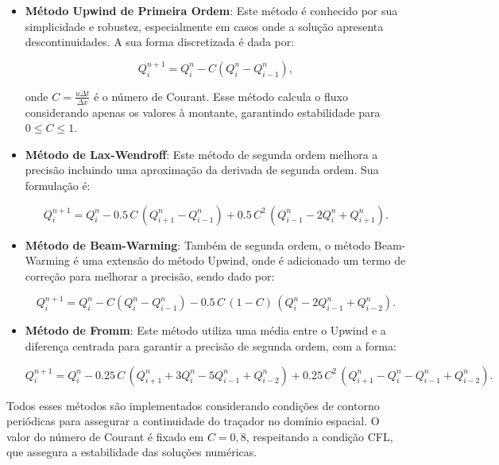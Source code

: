 \begin{itemize}
    \item \textbf{Método Upwind de Primeira Ordem}: Este método é conhecido por sua simplicidade e robustez, especialmente em casos onde a solução apresenta descontinuidades. A sua forma discretizada é dada por:

    \begin{equation}
        Q_i^{n+1} = Q_i^n - C (Q_i^n - Q_{i-1}^n),
    \end{equation}

    onde $C = \frac{u \Delta t}{\Delta x}$ é o número de Courant. Esse método calcula o fluxo considerando apenas os valores à montante, garantindo estabilidade para $0 \leq C \leq 1$.

    \item \textbf{Método de Lax-Wendroff}: Este método de segunda ordem melhora a precisão incluindo uma aproximação da derivada de segunda ordem. Sua formulação é:

    \begin{equation}
        Q_i^{n+1} = Q_i^n - 0.5 \, C \, (Q_{i+1}^n - Q_{i-1}^n) + 0.5 \, C^2 \, (Q_{i-1}^n - 2 Q_i^n + Q_{i+1}^n).
    \end{equation}

    \item \textbf{Método de Beam-Warming}: Também de segunda ordem, o método Beam-Warming é uma extensão do método Upwind, onde é adicionado um termo de correção para melhorar a precisão, sendo dado por:

    \begin{equation}
        Q_i^{n+1} = Q_i^n - C (Q_i^n - Q_{i-1}^n) - 0.5 \, C \, (1 - C) \, (Q_i^n - 2 Q_{i-1}^n + Q_{i-2}^n).
    \end{equation}

    \item \textbf{Método de Fromm}: Este método utiliza uma média entre o Upwind e a diferença centrada para garantir a precisão de segunda ordem, com a forma:

    \begin{equation}
        Q_i^{n+1} = Q_i^n - 0.25 \, C \, (Q_{i+1}^n + 3 Q_i^n - 5 Q_{i-1}^n + Q_{i-2}^n) + 0.25 \, C^2 \, (Q_{i+1}^n - Q_i^n - Q_{i-1}^n + Q_{i-2}^n).
    \end{equation}
\end{itemize}

Todos esses métodos são implementados considerando condições de contorno periódicas para assegurar a continuidade do traçador no domínio espacial. O valor do número de Courant é fixado em $C = 0,8$, respeitando a condição CFL, que assegura a estabilidade das soluções numéricas.


